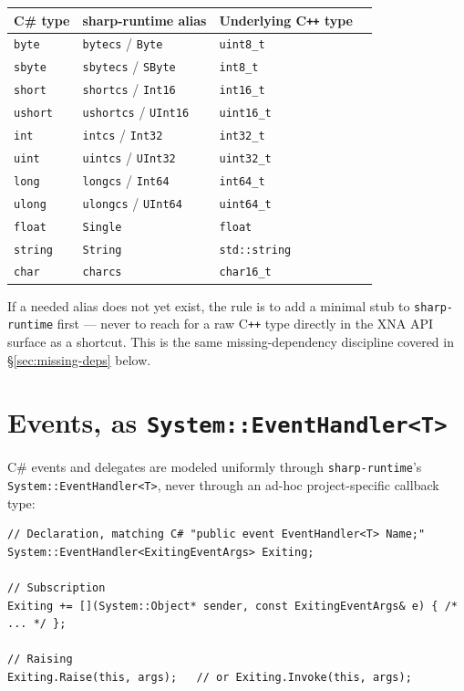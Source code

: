 \begin{center}
\begin{tabular}{llll}
\toprule
\textbf{C\# type} & \textbf{sharp-runtime alias} & \textbf{Underlying C\texttt{++} type} \\
\midrule
\texttt{byte}   & \texttt{bytecs} / \texttt{Byte}   & \texttt{uint8\_t} \\
\texttt{sbyte}  & \texttt{sbytecs} / \texttt{SByte} & \texttt{int8\_t} \\
\texttt{short}  & \texttt{shortcs} / \texttt{Int16} & \texttt{int16\_t} \\
\texttt{ushort} & \texttt{ushortcs} / \texttt{UInt16} & \texttt{uint16\_t} \\
\texttt{int}    & \texttt{intcs} / \texttt{Int32}   & \texttt{int32\_t} \\
\texttt{uint}   & \texttt{uintcs} / \texttt{UInt32} & \texttt{uint32\_t} \\
\texttt{long}   & \texttt{longcs} / \texttt{Int64}  & \texttt{int64\_t} \\
\texttt{ulong}  & \texttt{ulongcs} / \texttt{UInt64} & \texttt{uint64\_t} \\
\texttt{float}  & \texttt{Single}                   & \texttt{float} \\
\texttt{string} & \texttt{String}                   & \texttt{std::string} \\
\texttt{char}   & \texttt{charcs}                   & \texttt{char16\_t} \\
\bottomrule
\end{tabular}
\end{center}

If a needed alias does not yet exist, the rule is to add a minimal stub to
\texttt{sharp-runtime} first --- never to reach for a raw C\texttt{++} type directly in the
XNA API surface as a shortcut. This is the same missing-dependency discipline covered in
\S\ref{sec:missing-deps} below.

\section{Events, as \texttt{System::EventHandler<T>}}

C\# events and delegates are modeled uniformly through \texttt{sharp-runtime}'s
\texttt{System::EventHandler<T>}, never through an ad-hoc project-specific callback type:

\begin{lstlisting}
// Declaration, matching C# "public event EventHandler<T> Name;"
System::EventHandler<ExitingEventArgs> Exiting;

// Subscription
Exiting += [](System::Object* sender, const ExitingEventArgs& e) { /* ... */ };

// Raising
Exiting.Raise(this, args);   // or Exiting.Invoke(this, args);
\end{lstlisting}

